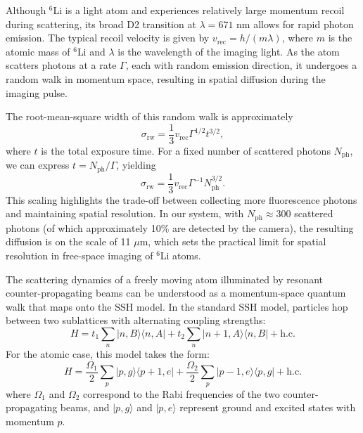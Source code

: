 Although $^6$Li is a light atom and experiences relatively large momentum recoil during scattering, its broad D2 transition at $\lambda = 671$ nm allows for rapid photon emission. The typical recoil velocity is given by $v_\mathrm{rec} = h/(m\lambda)$, where $m$ is the atomic mass of $^6$Li and $\lambda$ is the wavelength of the imaging light. As the atom scatters photons at a rate $\Gamma$, each with random emission direction, it undergoes a random walk in momentum space, resulting in spatial diffusion during the imaging pulse.

The root-mean-square width of this random walk is approximately \cite{kruip_design_2024}
\begin{equation}
\sigma_\mathrm{rw} = \frac{1}{3} v_\mathrm{rec} \Gamma^{1/2} t^{3/2},
\label{eq:sigmarw}
\end{equation}
where $t$ is the total exposure time. For a fixed number of scattered photons $N_\mathrm{ph}$, we can express $t = N_\mathrm{ph}/\Gamma$, yielding
\begin{equation}
\sigma_\mathrm{rw} = \frac{1}{3} v_\mathrm{rec} \Gamma^{-1} N_\mathrm{ph}^{3/2}.
\end{equation}
This scaling highlights the trade-off between collecting more fluorescence photons and maintaining spatial resolution. In our system, with $N_\mathrm{ph} \approx 300$ scattered photons (of which approximately 10\% are detected by the camera), the resulting diffusion is on the scale of 11 $\mu$m, which sets the practical limit for spatial resolution in free-space imaging of $^6$Li atoms.

The scattering dynamics of a freely moving atom illuminated by resonant counter-propagating beams can be understood as a momentum-space quantum walk that maps onto the SSH model. In the standard SSH model, particles hop between two sublattices with alternating coupling strengths:
\begin{equation}
H = t_1 \sum_n |n,B\rangle \langle n,A| + t_2 \sum_n |n+1,A\rangle \langle n,B| + \text{h.c.}
\end{equation}
For the atomic case, this model takes the form:
\begin{equation}
H = \frac{\Omega_1}{2} \sum_p |p,g\rangle \langle p+1,e| + \frac{\Omega_2}{2} \sum_p |p-1,e\rangle \langle p,g| + \text{h.c.}
\end{equation}
where $\Omega_1$ and $\Omega_2$ correspond to the Rabi frequencies of the two counter-propagating beams, and $|p,g\rangle$ and $|p,e\rangle$ represent ground and excited states with momentum $p$.

